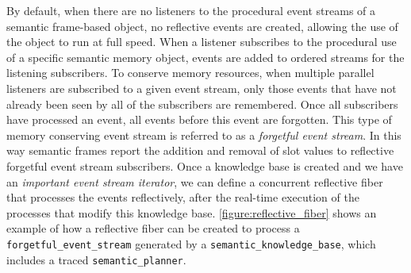 By default, when there are no listeners to the procedural event
streams of a semantic frame-based object, no reflective events are
created, allowing the use of the object to run at full speed.  When a
listener subscribes to the procedural use of a specific semantic
memory object, events are added to ordered streams for the listening
subscribers.  To conserve memory resources, when multiple parallel
listeners are subscribed to a given event stream, only those events
that have not already been seen by all of the subscribers are
remembered.  Once all subscribers have processed an event, all events
before this event are forgotten.  This type of memory conserving event
stream is referred to as a {\emph{forgetful event stream}}.  In this
way semantic frames report the addition and removal of slot values to
reflective forgetful event stream subscribers.  Once a knowledge base
is created and we have an {\emph{important event stream iterator}}, we
can define a concurrent reflective fiber that processes the events
reflectively, after the real-time execution of the processes that
modify this knowledge base.
{\mbox{\autoref{figure:reflective_fiber}}} shows an example of how a
reflective fiber can be created to process a
{\tt{forgetful\_event\_stream}} generated by a
{\tt{semantic\_knowledge\_base}}, which includes a traced
{\tt{semantic\_planner}}.
